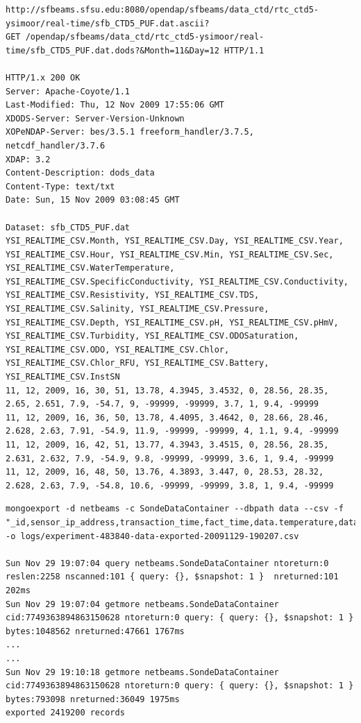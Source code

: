 \lstset{label=file:rtc-ysi-opendap,caption=HTTP GET Request x Response to the OPeNDAP server at SF-BEAMS}
\begin{lstlisting}
http://sfbeams.sfsu.edu:8080/opendap/sfbeams/data_ctd/rtc_ctd5-ysimoor/real-time/sfb_CTD5_PUF.dat.ascii?
GET /opendap/sfbeams/data_ctd/rtc_ctd5-ysimoor/real-time/sfb_CTD5_PUF.dat.dods?&Month=11&Day=12 HTTP/1.1

HTTP/1.x 200 OK
Server: Apache-Coyote/1.1
Last-Modified: Thu, 12 Nov 2009 17:55:06 GMT
XDODS-Server: Server-Version-Unknown
XOPeNDAP-Server: bes/3.5.1 freeform_handler/3.7.5, netcdf_handler/3.7.6
XDAP: 3.2
Content-Description: dods_data
Content-Type: text/txt
Date: Sun, 15 Nov 2009 03:08:45 GMT

Dataset: sfb_CTD5_PUF.dat
YSI_REALTIME_CSV.Month, YSI_REALTIME_CSV.Day, YSI_REALTIME_CSV.Year, YSI_REALTIME_CSV.Hour, YSI_REALTIME_CSV.Min, YSI_REALTIME_CSV.Sec, YSI_REALTIME_CSV.WaterTemperature, YSI_REALTIME_CSV.SpecificConductivity, YSI_REALTIME_CSV.Conductivity, YSI_REALTIME_CSV.Resistivity, YSI_REALTIME_CSV.TDS, YSI_REALTIME_CSV.Salinity, YSI_REALTIME_CSV.Pressure, YSI_REALTIME_CSV.Depth, YSI_REALTIME_CSV.pH, YSI_REALTIME_CSV.pHmV, YSI_REALTIME_CSV.Turbidity, YSI_REALTIME_CSV.ODOSaturation, YSI_REALTIME_CSV.ODO, YSI_REALTIME_CSV.Chlor, YSI_REALTIME_CSV.Chlor_RFU, YSI_REALTIME_CSV.Battery, YSI_REALTIME_CSV.InstSN
11, 12, 2009, 16, 30, 51, 13.78, 4.3945, 3.4532, 0, 28.56, 28.35, 2.65, 2.651, 7.9, -54.7, 9, -99999, -99999, 3.7, 1, 9.4, -99999
11, 12, 2009, 16, 36, 50, 13.78, 4.4095, 3.4642, 0, 28.66, 28.46, 2.628, 2.63, 7.91, -54.9, 11.9, -99999, -99999, 4, 1.1, 9.4, -99999
11, 12, 2009, 16, 42, 51, 13.77, 4.3943, 3.4515, 0, 28.56, 28.35, 2.631, 2.632, 7.9, -54.9, 9.8, -99999, -99999, 3.6, 1, 9.4, -99999
11, 12, 2009, 16, 48, 50, 13.76, 4.3893, 3.447, 0, 28.53, 28.32, 2.628, 2.63, 7.9, -54.8, 10.6, -99999, -99999, 3.8, 1, 9.4, -99999
\end{lstlisting}

\lstset{label=file:mongodb-export-command,caption=Export Command to CSV format}
\begin{lstlisting}
mongoexport -d netbeams -c SondeDataContainer --dbpath data --csv -f "_id,sensor_ip_address,transaction_time,fact_time,data.temperature,data.sp_condition,data.condition,data.resistence,data.salinitude,data.pressure,data.depth,data.ph,data.pH_mv,data.odo_sat,data.odo_condition,data.turbidity,data.battery" -o logs/experiment-483840-data-exported-20091129-190207.csv

Sun Nov 29 19:07:04 query netbeams.SondeDataContainer ntoreturn:0 reslen:2258 nscanned:101 { query: {}, $snapshot: 1 }  nreturned:101 202ms
Sun Nov 29 19:07:04 getmore netbeams.SondeDataContainer cid:7749363894863150628 ntoreturn:0 query: { query: {}, $snapshot: 1 }  bytes:1048562 nreturned:47661 1767ms
...
...
Sun Nov 29 19:10:18 getmore netbeams.SondeDataContainer cid:7749363894863150628 ntoreturn:0 query: { query: {}, $snapshot: 1 }  bytes:793098 nreturned:36049 1975ms
exported 2419200 records
\end{lstlisting}